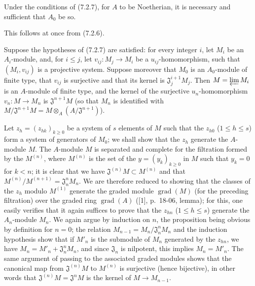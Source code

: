 \begin{corollary}[7.2.8]
\label{0.7.2.8}
Under the conditions of (7.2.7), for $A$ to be Noetherian, it is necessary and
sufficient that $A_0$ be so.
\end{corollary}

This follows at once from (7.2.6).

\begin{proposition}[7.2.9]
\label{0.7.2.9}
Suppose the hypotheses of (7.2.7) are satisfied: for every integer $i$, let
$M_i$ be an $A_i$-module, and, for $i\leq j$, let
$v_{ij}:M_j\to M_i$ be a $u_{ij}$-homomorphism, such that $(M_i,v_{ij})$ is a
projective system. Suppose moreover that $M_0$ is an $A_0$-module of finite
type, that $v_{ij}$ is surjective and that its kernel is
$\mathfrak J_j^{i+1}M_j$. Then $M=\varprojlim M_i$ is an $A$-module of finite
type, and the kernel of the surjective $u_n$-homomorphism $v_n:M\to M_n$ is
$\mathfrak J^{n+1}M$ \textup{(so that $M_n$ is identified with
$M/\mathfrak J^{n+1}M=M\otimes_A(A/\mathfrak J^{n+1})$)}.
\end{proposition}

Let $z_h=(z_{hk})_{k\geq0}$ be a system of $s$ elements of $M$ such that the
$z_{h0}$ ($1\leq h\leq s$) form a system of generators of $M_0$; we shall
show that the $z_h$ generate the $A$-module $M$. The $A$-module $M$ is
separated and complete for the filtration formed by the $M^{(n)}$, where $M^{(n)}$
is the set of the $y=(y_k)_{k\geq0}$ in $M$ such that $y_k=0$ for $k<n$;
it is clear that we have $\mathfrak J^{(n)}M\subset M^{(n)}$ and that
$M^{(n)}/M^{(n+1)}=\mathfrak J_n^nM_n$. We are therefore reduced to showing that the
classes of the $z_h$ modulo $M^{(1)}$ generate the graded module
$\operatorname{grad}(M)$ (for the preceding filtration) over the graded ring
$\operatorname{grad}(A)$ ([1], p.~18-06, lemma); for this, one easily
verifies that it again suffices to prove that the $z_{hn}$ ($1\leq h\leq s$)
generate the $A_n$-module $M_n$. We again argue by induction on
$n$, the proposition being obvious by definition for $n=0$; the relation
$M_{n-1}=M_n/\mathfrak J_n^nM_n$ and the induction hypothesis show that if
$M'_n$ is the submodule of $M_n$ generated by the $z_{hn}$, we have
$M_n=M'_n+\mathfrak J_n^nM_n$, and since $\mathfrak J_n$ is nilpotent, this
implies $M_n=M'_n$. The same argument of passing to the associated graded modules
shows that the canonical map from $\mathfrak J^{(n)}M$ to
$M^{(n)}$ is surjective (hence bijective), in other words that
$\mathfrak J^{(n)}M=\mathfrak J^nM$ is the kernel of $M\to M_{n-1}$.

